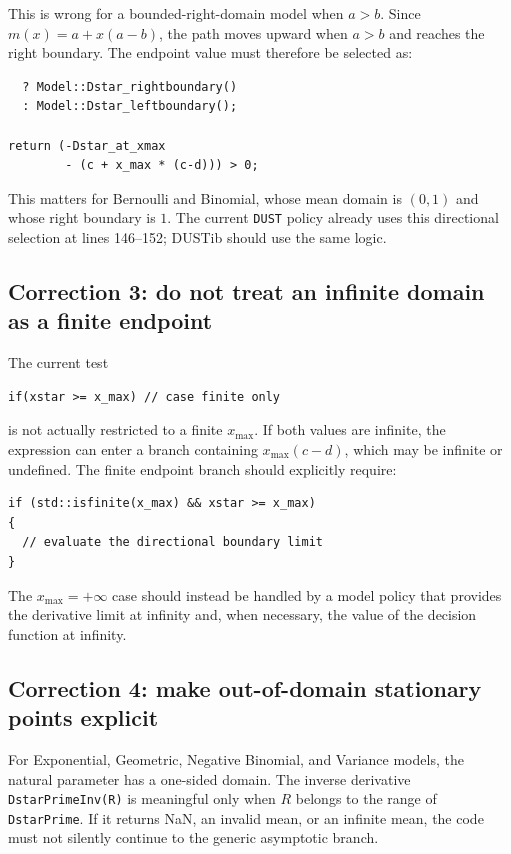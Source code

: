 \documentclass[11pt]{article}
\begin{document}
This is wrong for a bounded-right-domain model when $a>b$.  Since
$m(x)=a+x(a-b)$, the path moves upward when $a>b$ and reaches the right
boundary.  The endpoint value must therefore be selected as:

\begin{verbatim}
  ? Model::Dstar_rightboundary()
  : Model::Dstar_leftboundary();

return (-Dstar_at_xmax
        - (c + x_max * (c-d))) > 0;
\end{verbatim}

This matters for Bernoulli and Binomial, whose mean domain is $(0,1)$ and
whose right boundary is $1$.  The current \texttt{DUST} policy already uses
this directional selection at lines 146--152; DUSTib should use the same
logic.

\subsection{Correction 3: do not treat an infinite domain as a finite endpoint}

The current test

\begin{verbatim}
if(xstar >= x_max) // case finite only
\end{verbatim}

is not actually restricted to a finite $x_{\max}$.  If both values are
infinite, the expression can enter a branch containing
$x_{\max}(c-d)$, which may be infinite or undefined.  The finite endpoint
branch should explicitly require:

\begin{verbatim}
if (std::isfinite(x_max) && xstar >= x_max)
{
  // evaluate the directional boundary limit
}
\end{verbatim}

The $x_{\max}=+\infty$ case should instead be handled by a model policy that
provides the derivative limit at infinity and, when necessary, the value of
the decision function at infinity.

\subsection{Correction 4: make out-of-domain stationary points explicit}

For Exponential, Geometric, Negative Binomial, and Variance models, the
natural parameter has a one-sided domain.  The inverse derivative
\texttt{DstarPrimeInv(R)} is meaningful only when $R$ belongs to the range of
\texttt{DstarPrime}.  If it returns NaN, an invalid mean, or an infinite mean,
the code must not silently continue to the generic asymptotic branch.
\end{document}
